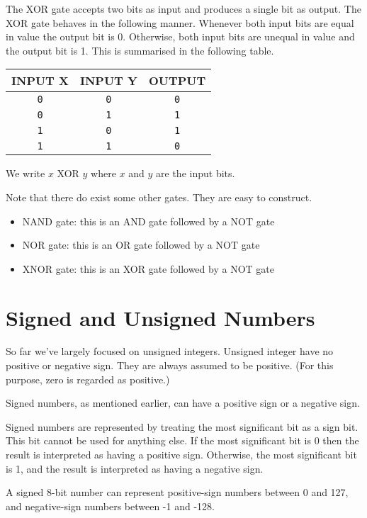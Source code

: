 The XOR gate accepts two bits as input and produces a single bit as output. The XOR gate behaves in the following manner. Whenever both input bits are equal in value the output bit is 0. Otherwise, both input bits are unequal in value and the output bit is 1. This is summarised in the following table.
\begin{center}
	\begin{tabular}{cc|c}
	  \hline
		INPUT X & INPUT Y & OUTPUT \\ \hline
		\texttt{0} & \texttt{0} & \texttt{0} \\ \hline
		\texttt{0} & \texttt{1} & \texttt{1} \\ \hline
		\texttt{1} & \texttt{0} & \texttt{1} \\ \hline
		\texttt{1} & \texttt{1} & \texttt{0} \\ \hline
	\end{tabular}
\end{center}

We write $x$ XOR $y$ where $x$ and $y$ are the input bits.

Note that there do exist some other gates. They are easy to construct.
\begin{itemize}
  \item NAND gate: this is an AND gate followed by a NOT gate
  \item NOR gate: this is an OR gate followed by a NOT gate
  \item XNOR gate: this is an XOR gate followed by a NOT gate
\end{itemize}

\section{Signed and Unsigned Numbers}
So far we've largely focused on unsigned integers. Unsigned integer have no positive or negative sign. They are always assumed to be positive. (For this purpose, zero is regarded as positive.)

Signed numbers, as mentioned earlier, can have a positive sign or a negative sign.

Signed numbers are represented by treating the most significant bit as a sign bit. This bit cannot be used for anything else. If the most significant bit is 0 then the result is interpreted as having a positive sign. Otherwise, the most significant bit is 1, and the result is interpreted as having a negative sign.

A signed 8-bit number can represent positive-sign numbers between 0 and 127, and negative-sign numbers between -1 and -128.


